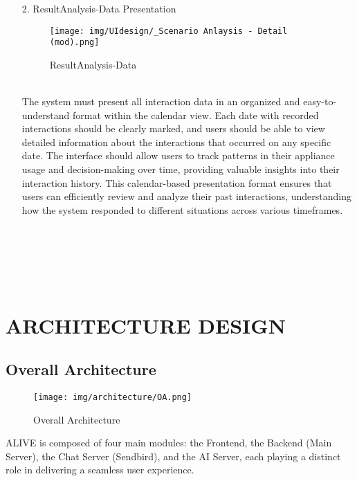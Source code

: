 \documentclass[conference]{IEEEtran}
\begin{document}
\begin{enumerate}
\begin{itemize}
\begin{itemize}
\begin{enumerate}
    \begin{enumerate}
        \item[2.] ResultAnalysis-Data 
        Presentation
        \begin{figure}[h]
        {\centering
        \hspace{4cm}
        \begin{minipage}{0.4\columnwidth}
            \texttt{[image: img/UIdesign/\_Scenario Anlaysis - Detail (mod).png]}
            \caption{ResultAnalysis-Data }
        \end{minipage}}
    \end{figure}
        \\ The system must present all interaction data in an organized and easy-to-understand format within the calendar view. Each date with recorded interactions should be clearly marked, and users should be able to view detailed information about the interactions that occurred on any specific date. The interface should allow users to track patterns in their appliance usage and decision-making over time, providing valuable insights into their interaction history. This calendar-based presentation format ensures that users can efficiently review and analyze their past interactions, understanding how the system responded to different situations across various timeframes. \\ \\ \\ \\ \\ \\ 
    \end{enumerate}

\section{ARCHITECTURE DESIGN}
\subsection{Overall Architecture}

\begin{figure}[h]
\centering   
\texttt{[image: img/architecture/OA.png]}
\caption{Overall Architecture}
\end{figure}

\hspace{0.7em} ALIVE is composed of four main modules: the Frontend, the Backend (Main Server), the Chat Server (Sendbird), and the AI Server, each playing a distinct role in delivering a seamless user experience. \\


\end{enumerate}
\end{itemize}
\end{itemize}
\end{enumerate}
\end{document}
